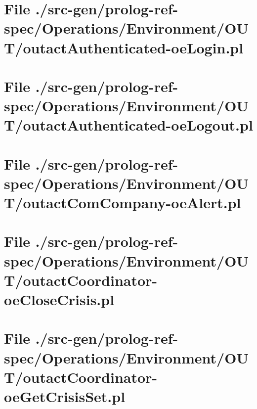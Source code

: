 \section[File /src-gen/prolog-ref-spec/Operations.../outactAuthenticated-oeLogin.pl]{File ./src-gen/prolog-ref-spec/Operations/Environment/OUT/outactAuthenticated-oeLogin.pl}
\scriptsize

\normalsize
	
\section[File /src-gen/prolog-ref-spec/Operations.../outactAuthenticated-oeLogout.pl]{File ./src-gen/prolog-ref-spec/Operations/Environment/OUT/outactAuthenticated-oeLogout.pl}
\scriptsize

\normalsize
	
\section[File /src-gen/prolog-ref-spec/Operations.../outactComCompany-oeAlert.pl]{File ./src-gen/prolog-ref-spec/Operations/Environment/OUT/outactComCompany-oeAlert.pl}
\scriptsize

\normalsize
	
\section[File /src-gen/prolog-ref-spec/Operations.../outactCoordinator-oeCloseCrisis.pl]{File ./src-gen/prolog-ref-spec/Operations/Environment/OUT/outactCoordinator-oeCloseCrisis.pl}
\scriptsize

\normalsize
	
\section[File /src-gen/prolog-ref-spec/Operations.../outactCoordinator-oeGetCrisisSet.pl]{File ./src-gen/prolog-ref-spec/Operations/Environment/OUT/outactCoordinator-oeGetCrisisSet.pl}
\scriptsize

\normalsize
	
